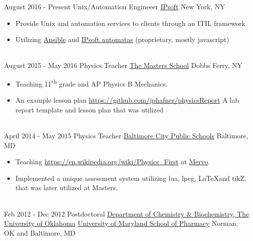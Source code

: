 \documentclass[letterpaper]{twentysecondcv} %
\begin{document}
\begin{twenty} %
\twentyitem
    	{August 2016 -}
		{Present}
        {Unix/Automation Engineeer}
        {\href{http://www.ipsoft.com/}{IPsoft}}
        {New York, NY}
        {\begin{itemize}
        \item Provide Unix and automation services to clients through an ITIL framework
        \item Utilizing \href{https://ansible.com}{Ansible} and \href{https://www.ipsoft.com/ipcenter/}{IPsoft automatas} (proprietary, mostly javascript) %
        \end{itemize}}
        \\
	\twentyitem
    	{August 2015 -}
		{May 2016}
        {Physics Teacher}
        {\href{http://www.mastersny.org/}{The Masters School}}
        {Dobbs Ferry, NY}
        {
        {\begin{itemize}
        \item Teaching 11\textsuperscript{th} grade and AP Physics B Mechanics.
        \item An example lesson plan \href{physicsReport}{https://github.com/jphafner/physicsReport}
          A lab report template and lesson plan that was utilized 
    	\end{itemize}}
        }
    \\   
    \twentyitem
   		{April 2014 -}
		{May 2015}
        {Physics Teacher}
        {\href{http://www.baltimorecityschools.org}{Baltimore City Public Schools}}
        {Baltimore, MD}
        {
        {\begin{itemize}
        \item Teaching \href{physics first}{https://en.wikipedia.org/wiki/Physics_First} at \href{https://mervo.org}{Mervo}.
        \item Implemented a unique assessment system utilizing lua, lpeg, \LaTeX and tikZ, that was later utilized at Masters.
    \end{itemize}}
        }
     \\
     \twentyitem
   		{Feb 2012 -}
		{Dec 2012}
        {Postdoctoral}
        {\href{http://www.ou.edu/cas/chemistry/}{Department of Chemistry \& Biochemistry, The University of Oklahoma}
        {\href{http://pharmacy.umaryland.edu}{University of Maryland School of Pharmacy}
        }
        {Norman, OK and Baltimore, MD}
        {
}}
\end{twenty}
\end{document}
